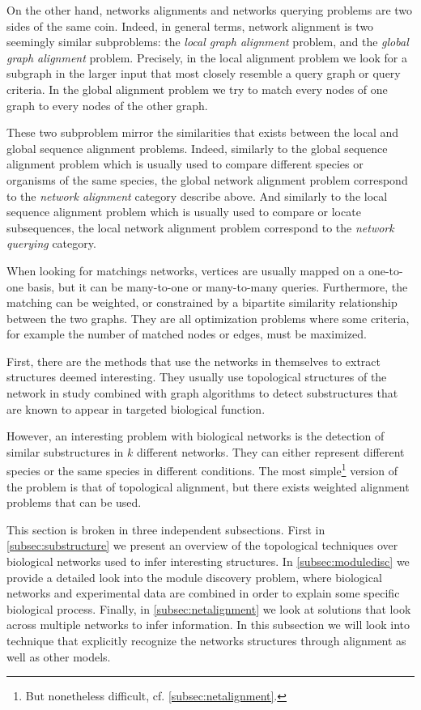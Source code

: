 	On the other hand, networks alignments and networks querying problems are two sides of the same coin.
	Indeed, in general terms, network alignment is two seemingly similar subproblems: the \emph{local graph alignment} problem, and the \emph{global graph alignment} problem.
	Precisely, in the local alignment problem we look for a subgraph in the larger input that most closely resemble a query graph or query criteria.
	In the global alignment problem we try to match every nodes of one graph to every nodes of the other graph.

	These two subproblem mirror the similarities that exists between the local and global sequence alignment problems.
	Indeed, similarly to the global sequence alignment problem which is usually used to compare different species or organisms of the same species, the global network alignment problem correspond to the \emph{network alignment} category describe above.
	And similarly to the local sequence alignment problem which is usually used to compare or locate subsequences, the local network alignment problem correspond to the \emph{network querying} category.

	When looking for matchings networks, vertices are usually mapped on a one-to-one basis, but it can be many-to-one or many-to-many queries.
	Furthermore, the matching can be weighted, or constrained by a bipartite similarity relationship between the two graphs.
	They are all optimization problems where some criteria, for example the number of matched nodes or edges, must be maximized.

	First, there are the methods that use the networks in themselves to extract structures deemed interesting.
	They usually use topological structures of the network in study combined with graph algorithms to detect substructures that are known to appear in targeted biological function.

	However, an interesting problem with biological networks is the detection of similar substructures in $k$ different networks.
	They can either represent different species or the same species in different conditions.
	The most simple\footnote{But nonetheless difficult, cf. \cref{subsec:netalignment}.} version of the problem is that of topological alignment, but there exists weighted alignment problems that can be used.

	This section is broken in three independent subsections.
	First in \cref{subsec:substructure} we present an overview of the topological techniques over biological networks used to infer interesting structures.
	In \cref{subsec:moduledisc} we provide a detailed look into the module discovery problem, where biological networks and experimental data are combined in order to explain some specific biological process.
	Finally, in \cref{subsec:netalignment} we look at solutions that look across multiple networks to infer information.
	In this subsection we will look into technique that explicitly recognize the networks structures through alignment as well as other models.

